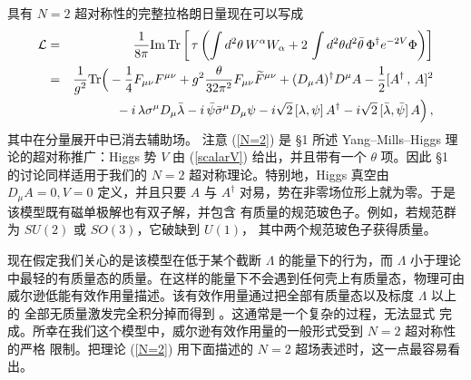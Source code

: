 具有 $N=2$ 超对称性的完整拉格朗日量现在可以写成
\begin{eqnarray}
{\cal L}&=&\frac{1}{8\pi}{\rm Im\, Tr}\left[\,\tau\left(\int d^2\theta\,
W^\alpha W_\alpha +2\,\int d^2\theta d^2\bar\theta\, \Phi^\dagger 
e^{-2V}\Phi \right)\right] 
\nonumber \\ 
&=&\frac{1}{g^2}{\rm Tr}\Big(-\frac{1}{4}F_{\mu\nu}F^{\mu\nu}+ 
g^2\frac{\theta}{32\pi^2}F_{\mu\nu}\widetilde F^{\mu\nu}+
(D_\mu A)^\dagger D^\mu A -\frac{1}{2} [A^\dagger\,,\,A]^2
\nonumber\\
&&{\hphantom {\frac{1}{g^2}{\rm Tr}(\,} }
-i\,\lambda\sigma^\mu D_\mu\bar\lambda -i\,\bar{\psi} 
\bar{\sigma}^\mu D_\mu\psi-i\sqrt{2}\,[\lambda,\psi]\,A^\dagger
-i\sqrt{2}\,[\bar\lambda,\bar\psi]\,A \Big)\,,
\label{N=2}
\end{eqnarray}
其中在分量展开中已消去辅助场。
注意 (\ref{N=2}) 是 §1 所述 Yang--Mills--Higgs 理论的超对称推广：Higgs 势 $V$
由 (\ref{scalarV}) 给出，并且带有一个 $\theta$ 项。因此 §1 的讨论同样适用于我们的
$N=2$ 超对称理论。特别地，Higgs 真空由 $D_\mu A=0, V=0$ 定义，并且只要 $A$ 与
$A^\dagger$ 对易，势在非零场位形上就为零。于是该模型既有磁单极解也有双子解，并包含
有质量的规范玻色子。例如，若规范群为 $SU(2)$ 或 $SO(3)$，它破缺到 $U(1)$，
其中两个规范玻色子获得质量。

现在假定我们关心的是该模型在低于某个截断 $\Lambda$ 的能量下的行为，而 $\Lambda$
小于理论中最轻的有质量态的质量。在这样的能量下不会遇到任何壳上有质量态，物理可由
威尔逊低能有效作用量描述。该有效作用量通过把全部有质量态以及标度 $\Lambda$ 以上的
全部无质量激发完全积分掉而得到 \cite{SV1,SV2}。这通常是一个复杂的过程，无法显式
完成。所幸在我们这个模型中，威尔逊有效作用量的一般形式受到 $N=2$ 超对称性的严格
限制。把理论 (\ref{N=2}) 用下面描述的 $N=2$ 超场表述时，这一点最容易看出。
 
